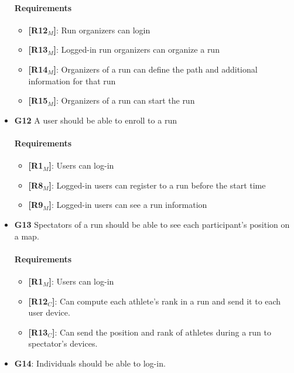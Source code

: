\begin{itemize}
    \paragraph{Requirements}
   \begin{itemize}
    \item \textbf{[R12$_M$]}: Run organizers can login
    \item \textbf{[R13$_M$]}: Logged-in run organizers can organize a run
    \item \textbf{[R14$_M$]}: Organizers of a run can define the path and additional information for that run
    \item \textbf{[R15$_M$]}: Organizers of a run can start the run
   \end{itemize}
   
   
    \item \textbf{G12} A user should be able to enroll to a run
    \paragraph{Requirements}
   \begin{itemize}
    \item \textbf{[R1$_M$]}: Users can log-in
    \item \textbf{[R8$_M$]}: Logged-in users can register to a run before the start time
    \item \textbf{[R9$_M$]}: Logged-in users can see a run information
   \end{itemize}

   
   
    \item \textbf{G13} Spectators of a run should be able to see each participant's position on a map.
    \paragraph{Requirements}
   \begin{itemize}
    \item \textbf{[R1$_M$]}: Users can log-in
    \item \textbf{[R12$_C$]}: Can compute each athlete's rank in a run and send it to each user device.
    \item \textbf{[R13$_C$]}: Can send the position and rank of athletes during a run to spectator's devices.
   \end{itemize}
   
   
       \item \textbf{G14}: Individuals should be able to log-in.

\end{itemize}
